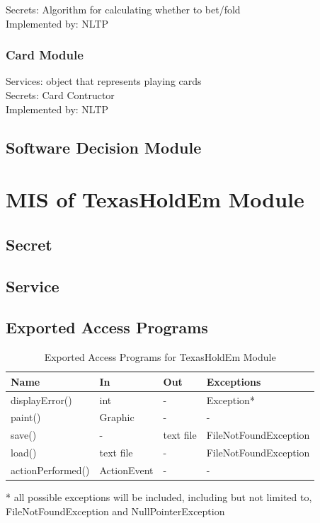 \documentclass[11pt]{article}
\begin{document}
    Secrets: Algorithm for calculating whether to bet/fold\\

    Implemented by: NLTP\\

    \subsubsection{Card Module}
    Services: object that represents playing cards\\

    Secrets: Card Contructor\\

    Implemented by: NLTP\\

    \subsection{Software Decision Module}
    
    \section{MIS of TexasHoldEm Module}
    \subsection{Secret}
    \subsection{Service}
    \subsection{Exported Access Programs}
    \begin{table}[h]
    \caption{Exported Access Programs for TexasHoldEm Module}
    \begin{tabular}{p{4cm}p{2cm}p{2cm}p{4cm}}
    Name & In & Out & Exceptions\\
    \hline
	displayError() & int & - & Exception*\\
	\hline
    paint() & Graphic & - & -\\
    \hline
    save() & - & text file & FileNotFoundException\\
    \hline
    load() & text file & - & FileNotFoundException\\
    \hline
    actionPerformed() & ActionEvent &  - & - \\
    \hline
    \end{tabular}
    * all possible exceptions will be included, including but not limited to, FileNotFoundException and NullPointerException
    \end{table}
    
\end{document}
